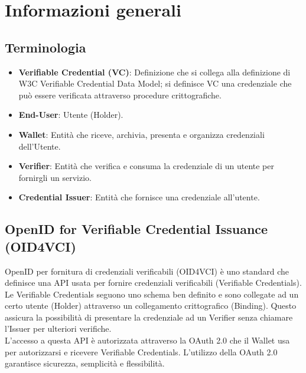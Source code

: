 \section{Informazioni generali}

\subsection{Terminologia}
\begin{itemize}
    \item \textbf{Verifiable Credential (VC)}: Definizione che si collega alla definizione di W3C Verifiable Credential Data Model; si definisce VC una credenziale che può essere verificata attraverso procedure crittografiche.
    \item \textbf{End-User}: Utente (Holder).
    \item \textbf{Wallet}: Entità che riceve, archivia, presenta e organizza credenziali dell'Utente.
    \item \textbf{Verifier}: Entità che verifica e consuma la credenziale di un utente per fornirgli un servizio.
    \item \textbf{Credential Issuer}: Entità che fornisce una credenziale all'utente.
\end{itemize}

\subsection{OpenID for Verifiable Credential Issuance (OID4VCI)}
OpenID per fornitura di credenziali verificabili (OID4VCI) è uno standard che definisce una API usata per fornire credenziali verificabili (Verifiable Credentials).
\\Le Verifiable Credentials seguono uno schema ben definito e sono collegate ad un certo utente (Holder) attraverso un collegamento crittografico (Binding). 
Questo assicura la possibilità di presentare la credenziale ad un Verifier senza chiamare l'Issuer per ulteriori verifiche.
\\L'accesso a questa API è autorizzata attraverso la OAuth 2.0 che il Wallet usa per autorizzarsi e ricevere Verifiable Credentials. L'utilizzo della OAuth 2.0 garantisce sicurezza, semplicità e flessibilità.

